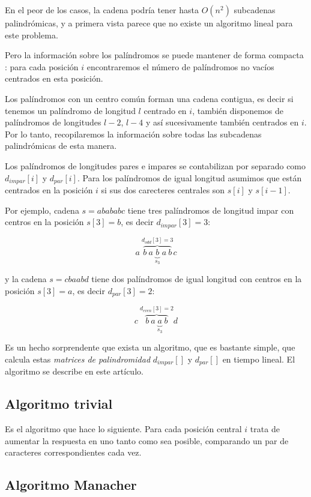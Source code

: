 En el peor de los casos, la cadena podría tener hasta $O(n^2)$ subcadenas palindrómicas, y a primera vista parece que no existe un algoritmo lineal para este problema.

Pero la información sobre los palíndromos se puede mantener de forma compacta : para cada posición $i$ encontraremos el número de palíndromos no vacíos centrados en esta posición.

Los palíndromos con un centro común forman una cadena contigua, es decir si tenemos un palíndromo de longitud $l$ centrado en $i$, también disponemos de palíndromos de longitudes $l-2$, $l-4$ y así sucesivamente también centrados en $i$. Por lo tanto, recopilaremos la información sobre todas las subcadenas palindrómicas de esta manera.

Los palíndromos de longitudes pares e impares se contabilizan por separado como $d_{impar}[i]$ y $d_{par}[i]$. Para los palíndromos de igual longitud asumimos que están centrados en la posición $i$ si sus dos carecteres centrales son $s[i]$ y $s[i-1]$.

Por ejemplo, cadena $s = abababc$ tiene tres palíndromos de longitud impar con centros en la posición $s[3] = b$, es decir $d_{impar}[3] = 3$:

$$a\ \overbrace{b\ a\ \underbrace{b}_{s_3}\ a\ b}^{d_{odd}[3]=3} c$$

y la cadena $s = cbaabd$ tiene dos palíndromos de igual longitud con centros en la posición $s[3] = a$, es decir $d_{par}[3] = 2$:

$$c\ \overbrace{b\ a\ \underbrace{a}_{s_3}\ b}^{d_{even}[3]=2} d$$

Es un hecho sorprendente que exista un algoritmo, que es bastante simple, que calcula estas \emph{matrices de palindromidad} $d_{impar}[]$ y $d_{par}[]$ en tiempo lineal. El algoritmo se describe en este artículo.

\subsection{Algoritmo trivial}

Es el algoritmo que hace lo siguiente. Para cada posición central $i$ trata de aumentar la respuesta en uno tanto como sea posible, comparando un par de caracteres correspondientes cada vez.

\subsection{Algoritmo Manacher}

